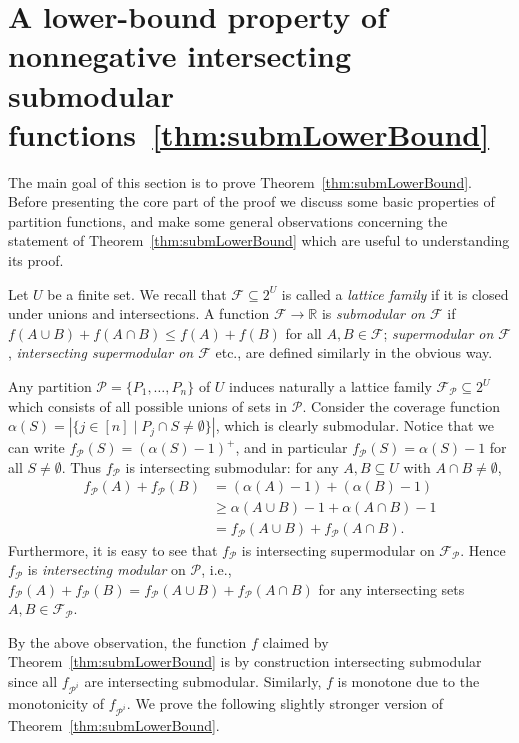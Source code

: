 \documentclass[11pt, letterpaper]{article}
\theoremstyle{definition}
\newcommand{\R}{\mathbb{R}}
\begin{document}
\section{A lower-bound property of nonnegative intersecting submodular functions~\ref{thm:submLowerBound}}\label{appendix:sub}

The main goal of this section is to prove 
Theorem~\ref{thm:submLowerBound}. Before presenting the core
part of the proof we discuss some basic properties of partition
functions, and make some general observations concerning
the statement of Theorem~\ref{thm:submLowerBound} which are
useful to understanding its proof.

Let $U$ be a finite set. We recall that $\mathcal{F}\subseteq 2^U$
is called a \emph{lattice family} if it is closed under unions
and intersections.
A function $\mathcal{F} \rightarrow \R$ is \emph{submodular on $\mathcal{F}$} if $f(A\cup B) + f(A \cap B) \leq f(A) + f(B)$ for all $A,B \in \mathcal{F}$; \emph{supermodular on $\mathcal{F}$}, \emph{intersecting supermodular on $\mathcal{F}$} etc., are defined similarly in the obvious way.

Any partition $\mathcal{P}=\{P_1,\dots, P_n\}$ of $U$ induces
naturally a lattice family $\mathcal{F}_{\mathcal{P}}\subseteq 2^U$
which consists of all possible unions of sets in $\mathcal{P}$.
Consider the coverage function
$\alpha(S)=|\{j\in [n] \mid P_j\cap S\neq \emptyset\}|$, which is clearly submodular.
Notice that we can write $f_{\mathcal{P}}(S) = (\alpha(S)-1)^+$, and in particular 
$f_{\mathcal{P}}(S) = \alpha(S)-1$ for all $S \neq \emptyset$.
Thus $f_{\mathcal{P}}$ is intersecting submodular:
for any $A,B \subseteq U$ with $A \cap B \neq \emptyset$,
\begin{align*}
f_{\mathcal{P}}(A) + f_{\mathcal{P}}(B) &= (\alpha(A)-1) + (\alpha(B)-1)\\
  &\geq \alpha(A\cup B) -1 + \alpha(A\cap B) -1\\
&= f_{\mathcal{P}}(A\cup B) + f_{\mathcal{P}}(A\cap B).
\end{align*}
Furthermore, it is easy to see that 
$f_{\mathcal{P}}$ is intersecting supermodular
on $\mathcal{F}_{\mathcal{P}}$. Hence $f_{\mathcal{P}}$
is \emph{intersecting modular} on $\mathcal{P}$, i.e.,
$f_{\mathcal{P}}(A)+f_{\mathcal{P}}(B)=f_{\mathcal{P}}(A\cup B)+f_{\mathcal{P}}(A\cap B)$ for
any intersecting sets $A,B\in \mathcal{F}_{\mathcal{P}}$.

By the above observation, the
function $f$ claimed by Theorem~\ref{thm:submLowerBound}
is by construction intersecting submodular since all $f_{\mathcal{P}^i}$
are intersecting submodular. Similarly, $f$ is monotone
due to the monotonicity of $f_{\mathcal{P}^i}$.
We prove the following slightly stronger version of
Theorem~\ref{thm:submLowerBound}.
\end{document}
